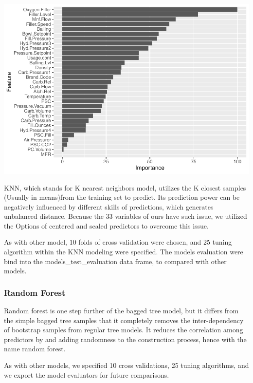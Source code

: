 \documentclass[]{article}
\begin{document}
\begin{center}\includegraphics{OmerOzeren_GracieHan_Project_2_files/figure-latex/unnamed-chunk-20-2} \end{center}

KNN, which stands for K nearest neighbors model, utilizes the K closest
samples (Usually in means)from the training set to predict. Its
prediction power can be negatively influenced by different skills of
predictions, which generates unbalanced distance. Because the 33
variables of ours have such issue, we utilized the Options of centered
and scaled predictors to overcome this issue.

As with other model, 10 folds of cross validation were chosen, and 25
tuning algorithm within the KNN modeling were specified. The models
evaluation were bind into the models\_test\_evaluation data frame, to
compared with other models.

\subsubsection{Random Forest}\label{random-forest}

Random forest is one step further of the bagged tree model, but it
differs from the simple bagged tree samples that it completely removes
the inter-dependency of bootstrap samples from regular tree models. It
reduces the correlation among predictors by and adding randomness to the
construction process, hence with the name random forest.

As with other models, we specified 10 cross validations, 25 tuning
algorithms, and we export the model evaluators for future comparisons.
\end{document}
